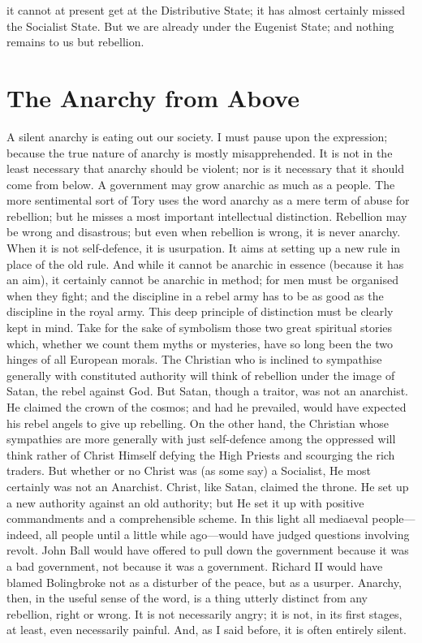 \documentclass{book}
\begin{document}
it cannot at present get at the Distributive State; it has almost certainly missed the Socialist State. But we are already under the Eugenist State; and nothing remains to us but rebellion.

\chapter{The Anarchy from Above}
\label{chapter-4}
A silent anarchy is eating out our society. I must pause upon the expression; because the true nature of anarchy is mostly misapprehended. It is not in the least necessary that anarchy should be violent; nor is it necessary that it should come from below. A government may grow anarchic as much as a people. The more sentimental sort of Tory uses the word anarchy as a mere term of abuse for rebellion; but he misses a most important intellectual distinction. Rebellion may be wrong and disastrous; but even when rebellion is wrong, it is never anarchy. When it is not self-defence, it is usurpation. It aims at setting up a new rule in place of the old rule. And while it cannot be anarchic in essence (because it has an aim), it certainly cannot be anarchic in method; for men must be organised when they fight; and the discipline in a rebel army has to be as good as the discipline in the royal army. This deep principle of distinction must be clearly kept in mind. Take for the sake of symbolism those two great spiritual stories which, whether we count them myths or mysteries, have so long been the two hinges of all European morals. The Christian who is inclined to sympathise generally with constituted authority will think of rebellion under the image of Satan, the rebel against God. But Satan, though a traitor, was not an anarchist. He claimed the crown of the cosmos; and had he prevailed, would have expected his rebel angels to give up rebelling. On the other hand, the Christian whose sympathies are more generally with just self-defence among the oppressed will think rather of Christ Himself defying the High Priests and scourging the rich traders. But whether or no Christ was (as some say) a Socialist, He most certainly was not an Anarchist. Christ, like Satan, claimed the throne. He set up a new authority against an old authority; but He set it up with positive commandments and a comprehensible scheme. In this light all mediaeval people—indeed, all people until a little while ago—would have judged questions involving revolt. John Ball would have offered to pull down the government because it was a bad government, not because it was a government. Richard II would have blamed Bolingbroke not as a disturber of the peace, but as a usurper. Anarchy, then, in the useful sense of the word, is a thing utterly distinct from any rebellion, right or wrong. It is not necessarily angry; it is not, in its first stages, at least, even necessarily painful. And, as I said before, it is often entirely silent.
\end{document}
